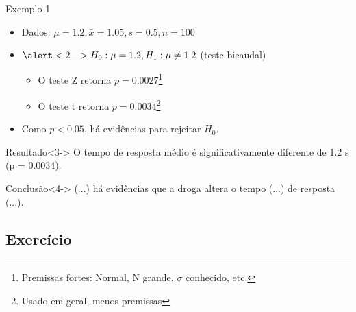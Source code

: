 \documentclass{beamer}
\begin{document}
\begin{frame}{\scriptsize Exemplo 1}
    \begin{itemize}
      \scriptsize
    \item Dados: $\mu = 1.2, \bar{x} = 1.05, s = 0.5, n=100$
    \item $\alert<2->{H_0: \mu = 1.2}, H_1: \mu \ne 1.2$ (teste bicaudal)
      \begin{itemize}
        \scriptsize
      \item \sout{O teste Z retorna $p = 0.0027$}\footnote{\tiny Premissas fortes: Normal, N grande, $\sigma$ conhecido, etc.}
      \item O teste t retorna $p = 0.0034$\footnote{\tiny Usado em geral, menos premissas}
      \end{itemize}
    \item<2-> Como $p < 0.05$, há evidências para rejeitar \alert<2->{$H_0$}.
    \end{itemize}
  \begin{exampleblock}{Resultado}<3->
    \footnotesize
    O tempo de resposta médio é \alert{significativamente} diferente de 1.2 s ({\footnotesize p = 0.0034}).
  \end{exampleblock}
  \begin{exampleblock}{Conclusão}<4->
    \footnotesize
    (...) há evidências que a droga altera o tempo (...)  de resposta (...).
  \end{exampleblock}

\end{frame}


\subsection{Exercício}
\end{document}

